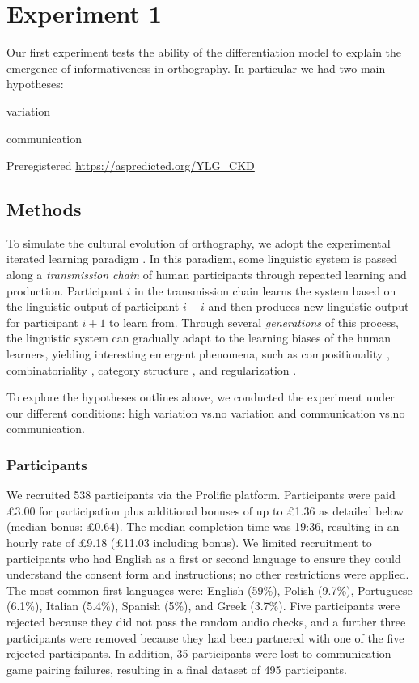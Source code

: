 \documentclass[doc,biblatex]{apa7}
\begin{document}

\section{Experiment 1}

Our first experiment tests the ability of the differentiation model to explain the emergence of informativeness in orthography. In particular we had two main hypotheses:

variation

communication

Preregistered \url{https://aspredicted.org/YLG_CKD}

\subsection{Methods}

To simulate the cultural evolution of orthography, we adopt the experimental iterated learning paradigm \parencite{Kirby:2008, Kirby:2015}. In this paradigm, some linguistic system is passed along a \textit{transmission chain} of human participants through repeated learning and production. Participant $i$ in the transmission chain learns the system based on the linguistic output of participant $i-i$ and then produces new linguistic output for participant $i+1$ to learn from. Through several \textit{generations} of this process, the linguistic system can gradually adapt to the learning biases of the human learners, yielding interesting emergent phenomena, such as compositionality \parencite{Kirby:2008, Kirby:2015}, combinatoriality \parencite{Verhoef:2015}, category structure \parencite{Carr:2017, Carr:2020}, and regularization \parencite{Smith:2010, Ferdinand:2019}.

To explore the hypotheses outlines above, we conducted the experiment under our different conditions: high variation vs.\@ no variation and communication vs.\@ no communication.

\subsubsection{Participants}

We recruited 538 participants via the Prolific platform. Participants were paid £3.00 for participation plus additional bonuses of up to £1.36 as detailed below (median bonus: £0.64). The median completion time was 19:36, resulting in an hourly rate of £9.18 (£11.03 including bonus). We limited recruitment to participants who had English as a first or second language to ensure they could understand the consent form and instructions; no other restrictions were applied. The most common first languages were: English (59\%), Polish (9.7\%), Portuguese (6.1\%), Italian (5.4\%), Spanish (5\%), and Greek (3.7\%). Five participants were rejected because they did not pass the random audio checks, and a further three participants were removed because they had been partnered with one of the five rejected participants. In addition, 35 participants were lost to communication-game pairing failures, resulting in a final dataset of 495 participants.
\end{document}
